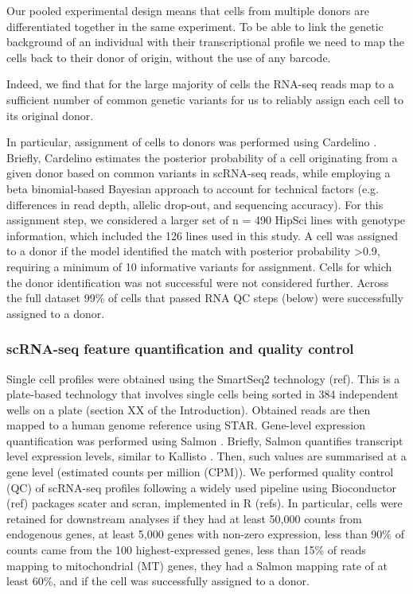 Our pooled experimental design means that cells from multiple donors are differentiated together in the same experiment. 
To be able to link the genetic background of an individual with their transcriptional profile we need to map the cells back to their donor of origin, without the use of any barcode.

Indeed, we find that for the large majority of cells the RNA-seq reads map to a sufficient number of common genetic variants for us to reliably assign each cell to its original donor.

In particular, assignment of cells to donors was performed using Cardelino \cite{mccarthy2020cardelino}. 
Briefly, Cardelino estimates the posterior probability of a cell originating from a given donor based on common variants in scRNA-seq reads, while employing a beta binomial-based Bayesian approach to account for technical factors (e.g. differences in read depth, allelic drop-out, and sequencing accuracy). 
For this assignment step, we considered a larger set of n = 490 HipSci lines with genotype information, which included the 126 lines used in this study. 
A cell was assigned to a donor if the model identified the match with posterior probability >0.9, requiring a minimum of 10 informative variants for assignment. 
Cells for which the donor identification was not successful were not considered further.
Across the full dataset 99\% of cells that passed RNA QC steps (below) were successfully assigned to a donor.

\subsubsection{scRNA-seq feature quantification and quality control}

Single cell profiles were obtained using the SmartSeq2 technology (ref). 
This is a plate-based technology that involves single cells being sorted in 384 independent wells on a plate (section XX of the Introduction). 
Obtained reads are then mapped to a human genome reference using STAR. 
Gene-level expression quantification was performed using Salmon \cite{patro2017salmon}. 
Briefly, Salmon quantifies transcript level expression levels, similar to Kallisto \cite{bray2016near}.
Then, such values are summarised at a gene level (estimated counts per million (CPM)).
We performed quality control (QC) of scRNA-seq profiles following a widely used pipeline using Bioconductor (ref) packages scater \cite{mccarthy2017scater} and scran, implemented in R (refs).  
In particular, cells were retained for downstream analyses if they had at least 50,000 counts from endogenous genes, at least 5,000 genes with non-zero expression, less than 90\% of counts came from the 100 highest-expressed genes, less than 15\% of reads mapping to mitochondrial (MT) genes, they had a Salmon mapping rate of at least 60\%, and if the cell was successfully assigned to a donor. 

